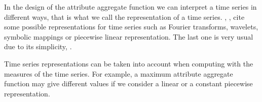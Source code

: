 




In the design of the attribute aggregate function we can interpret a
time series in different ways, that is what we call the representation
of a time series. \citeauthor{last:keogh}, \cite{last:keogh}, cite
some possible representations for time series such as Fourier
transforms, wavelets, symbolic mappings or piecewise linear
representation. The last one is very usual due to its simplicity,
\cite{keogh01}.

Time series representations can be taken into account when computing
with the measures of the time series.  For example, a maximum
attribute aggregate function may give different values if we consider
a linear or a constant piecewise representation.

